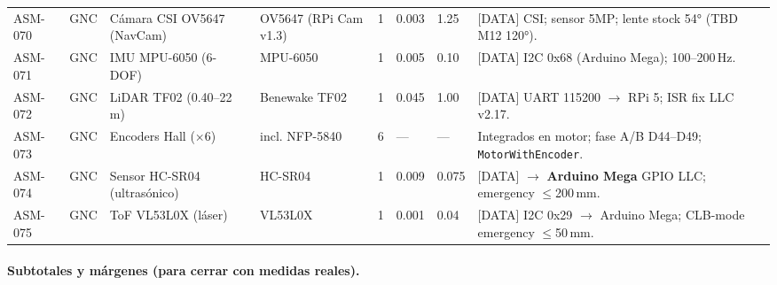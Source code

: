 \begin{table}[H]
{\begin{tabular}{p{1.4cm} p{1.5cm} p{4.5cm} p{3.5cm} p{0.9cm} p{1.5cm} p{1.5cm} p{4.5cm}}
ASM-070 & GNC & Cámara CSI OV5647 (NavCam) & OV5647 (RPi Cam v1.3) & 1 & 0.003 & 1.25 & [DATA] CSI; sensor 5MP; lente stock 54° (TBD M12 120°). \\
ASM-071 & GNC & IMU MPU-6050 (6-DOF) & MPU-6050 & 1 & 0.005 & 0.10 & [DATA] I2C 0x68 (Arduino Mega); 100--200\,Hz. \\
ASM-072 & GNC & LiDAR TF02 (0.40--22\,m) & Benewake TF02 & 1 & 0.045 & 1.00 & [DATA] UART 115200 $\rightarrow$ RPi 5; ISR fix LLC v2.17. \\
ASM-073 & GNC & Encoders Hall ($\times$6) & incl. NFP-5840 & 6 & --- & --- & Integrados en motor; fase A/B D44--D49; \texttt{MotorWithEncoder}. \\
ASM-074 & GNC & Sensor HC-SR04 (ultrasónico) & HC-SR04 & 1 & 0.009 & 0.075 & [DATA] $\rightarrow$ \textbf{Arduino Mega} GPIO LLC; emergency $\le$200\,mm. \\
ASM-075 & GNC & ToF VL53L0X (láser) & VL53L0X & 1 & 0.001 & 0.04 & [DATA] I2C 0x29 $\rightarrow$ Arduino Mega; CLB-mode emergency $\le$50\,mm. \\
\hline
\end{tabular}}
\end{table}

\paragraph{Subtotales y márgenes (para cerrar con medidas reales).}
\begin{table}[H]
\centering
\caption{Subtotales de masa y potencia por subsistema (consolidados para estimación de autonomía y carga).}
\small
\renewcommand{\arraystretch}{1.15}
\end{table}

